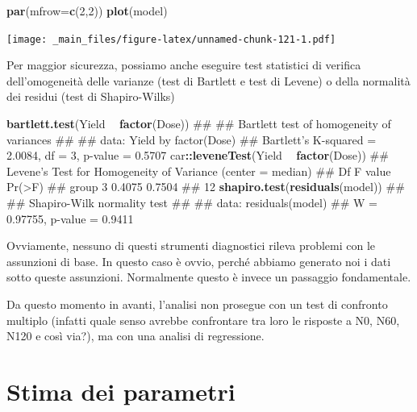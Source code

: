\documentclass[a4paper,12pt,oneside]{book}
\newenvironment{Shaded}{\begin{snugshade}}{\end{snugshade}}
\newcommand{\KeywordTok}[1]{\textcolor[rgb]{0.13,0.29,0.53}{\textbf{#1}}}
\newcommand{\DataTypeTok}[1]{\textcolor[rgb]{0.13,0.29,0.53}{#1}}
\newcommand{\DecValTok}[1]{\textcolor[rgb]{0.00,0.00,0.81}{#1}}
\newcommand{\StringTok}[1]{\textcolor[rgb]{0.31,0.60,0.02}{#1}}
\newcommand{\OperatorTok}[1]{\textcolor[rgb]{0.81,0.36,0.00}{\textbf{#1}}}
\newcommand{\NormalTok}[1]{#1}
\theoremstyle{definition}
\theoremstyle{definition}
\theoremstyle{definition}
\theoremstyle{remark}
\begin{document}
\begin{Shaded}
\begin{Highlighting}[]
\KeywordTok{par}\NormalTok{(}\DataTypeTok{mfrow=}\KeywordTok{c}\NormalTok{(}\DecValTok{2}\NormalTok{,}\DecValTok{2}\NormalTok{))}
\KeywordTok{plot}\NormalTok{(model)}
\end{Highlighting}
\end{Shaded}

\texttt{[image: \_main\_files/figure-latex/unnamed-chunk-121-1.pdf]}

Per maggior sicurezza, possiamo anche eseguire test statistici di
verifica dell'omogeneità delle varianze (test di Bartlett e test di
Levene) o della normalità dei residui (test di Shapiro-Wilks)

\begin{Shaded}
\begin{Highlighting}[]
\KeywordTok{bartlett.test}\NormalTok{(Yield }\OperatorTok{~}\StringTok{ }\KeywordTok{factor}\NormalTok{(Dose))}
\NormalTok{## }
\NormalTok{##  Bartlett test of homogeneity of variances}
\NormalTok{## }
\NormalTok{## data:  Yield by factor(Dose)}
\NormalTok{## Bartlett's K-squared = 2.0084, df = 3, p-value = 0.5707}
\NormalTok{car}\OperatorTok{::}\KeywordTok{leveneTest}\NormalTok{(Yield }\OperatorTok{~}\StringTok{ }\KeywordTok{factor}\NormalTok{(Dose))}
\NormalTok{## Levene's Test for Homogeneity of Variance (center = median)}
\NormalTok{##       Df F value Pr(>F)}
\NormalTok{## group  3  0.4075 0.7504}
\NormalTok{##       12}
\KeywordTok{shapiro.test}\NormalTok{(}\KeywordTok{residuals}\NormalTok{(model))}
\NormalTok{## }
\NormalTok{##  Shapiro-Wilk normality test}
\NormalTok{## }
\NormalTok{## data:  residuals(model)}
\NormalTok{## W = 0.97755, p-value = 0.9411}
\end{Highlighting}
\end{Shaded}

Ovviamente, nessuno di questi strumenti diagnostici rileva problemi con
le assunzioni di base. In questo caso è ovvio, perché abbiamo generato
noi i dati sotto queste assunzioni. Normalmente questo è invece un
passaggio fondamentale.

Da questo momento in avanti, l'analisi non prosegue con un test di
confronto multiplo (infatti quale senso avrebbe confrontare tra loro le
risposte a N0, N60, N120 e così via?), ma con una analisi di
regressione.

\section{Stima dei parametri}\label{stima-dei-parametri-2}
\end{document}
